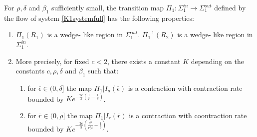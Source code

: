 \begin{prop}
For $\rho, \delta$ and $\beta_1$ sufficiently small, the transition map $\Pi_1: \Sigma^{in}_1 \to \Sigma^{out}_1$ defined by the flow of system \ref{K1systemfull} has the following properties:
\begin{enumerate}
\item $\Pi_1(R_1)$ is a wedge- like region in $\Sigma^{out}_1$. $\Pi_1^{-1}(R_2)$  is a wedge- like region in $\Sigma^{in}_1$.
\item More precisely, for fixed $c<2$, there exists a constant $K$ depending on the constants $c, \rho, \delta$ and $\beta_1$ such that:
\begin{enumerate}
\item for $\overline{\epsilon}\in (0, \delta] $ the map $\Pi_1 |I_a(\overline{\epsilon})$ is a contraction with contraction rate bounded by $Ke^{-\frac{2c}{3} \left(\frac{1}{\overline{\epsilon}} - \frac{1}{\delta} \right)}$.
\item for $\overline{r} \in (0, \rho] $ the map $\Pi_1 |I_r(\overline{r})$ is a contraction with coontraction rate bounded by $Ke^{-\frac{2c}{3} \left(\frac{\rho^3}{r_1^3 \delta} - \frac{1}{\delta} \right)}$.
\end{enumerate}
\end{enumerate}
\end{prop}

